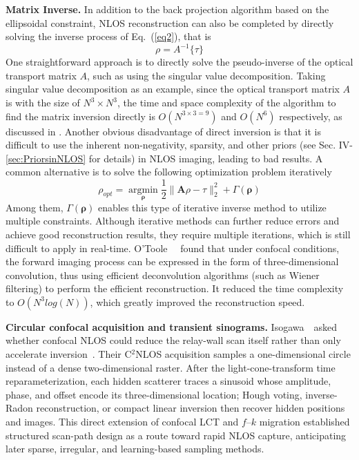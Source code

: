 \vspace{0.8mm}
\noindent \textbf{Matrix Inverse.}
In addition to the back projection algorithm based on the ellipsoidal constraint, NLOS reconstruction can also be completed by directly solving the inverse process of Eq.~(\ref{eq2}), that is
\begin{equation}
    \rho = A^{-1}\{\tau\}
    \label{inverse}
\end{equation}
One straightforward approach is to directly solve the pseudo-inverse of the optical transport matrix $A$, such as using the singular value decomposition. Taking singular value decomposition as an example, since the optical transport matrix $A$ is with the size of $N^3 \times N^3$,  the time and space complexity of the algorithm to find the matrix inversion directly is $O(N^{3\times 3=9})$ and $O(N^6)$ respectively, as discussed in \cite{otooleConfocalNonlineofsightImaging2018}.
Another obvious disadvantage of direct inversion is that it is difficult to use the inherent non-negativity, sparsity, and other priors (see Sec. IV-\ref{sec:PriorsinNLOS} for details) in NLOS imaging, leading to bad results. A common alternative is to solve the following optimization problem\cite{heideDiffuseMirrors3D2014} iteratively
\begin{equation}
\rho_{opt}=\underset{\mathbf{\rho}}{\operatorname{argmin}} \frac{1}{2}\|\mathbf{A} \rho -\tau\|_{2}^{2}+\Gamma(\mathbf{\rho})
\label{eqK}
\end{equation}
Among them, $\Gamma(\mathbf{\rho})$ enables this type of iterative inverse method to utilize multiple constraints. Although iterative methods\cite{guptaReconstructionHidden3D2012,buttafavaNonlineofsightImagingUsing2015} can further reduce errors and achieve good reconstruction results, they require multiple iterations, which is still difficult to apply in real-time. O'Toole \etal~\cite{otooleConfocalNonlineofsightImaging2018}~found that under confocal conditions, the forward imaging process can be expressed in the form of three-dimensional convolution, thus using efficient deconvolution algorithms (such as Wiener filtering) to perform the efficient reconstruction. It reduced the time complexity to $O(N^3log(N))$, which greatly improved the reconstruction speed. 

\vspace{0.8mm}
\noindent \textbf{Circular confocal acquisition and transient sinograms.}
Isogawa~\etal~asked whether confocal NLOS could reduce the relay-wall scan itself rather than only accelerate inversion~\cite{isogawaTransientSinograms2020}. Their C$^2$NLOS acquisition samples a one-dimensional circle instead of a dense two-dimensional raster. After the light-cone-transform time reparameterization, each hidden scatterer traces a sinusoid whose amplitude, phase, and offset encode its three-dimensional location; Hough voting, inverse-Radon reconstruction, or compact linear inversion then recover hidden positions and images. This direct extension of confocal LCT and $f$--$k$ migration established structured scan-path design as a route toward rapid NLOS capture, anticipating later sparse, irregular, and learning-based sampling methods.
% 

